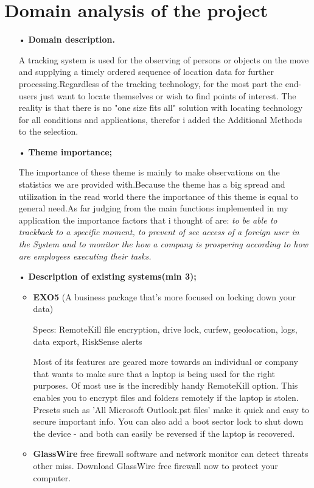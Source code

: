 \section{Domain analysis of the project}
\begin{itemize}
\item[•]\textbf{ Domain description.} \par
A tracking system is used for the observing of persons or objects on the move and supplying a timely ordered sequence of location data for further processing.Regardless of the tracking technology, for the most part the end-users just want to locate themselves or wish to find points of interest. The reality is that there is no "one size fits all" solution with locating technology for all conditions and applications, therefor i added the Additional Methods to the selection.
\item[•] \textbf{Theme importance;} \par
The importance of these theme is mainly to make observations on the statistics we are provided with.Because the theme has a big spread and utilization in the read world there the importance of this theme is equal to general need.As far judging from the main functions implemented in my application the importance factors that i thought of are: \textit{to be able to trackback to a specific moment, to prevent of see access of a foreign user in the System and to monitor the how a company is prospering according to how are employees executing their tasks.} 
\item[•] \textbf{Description of existing systems(min 3);}
\begin{itemize}
\item \textbf{EXO5} (A business package that's more focused on locking down your data)\par
Specs: RemoteKill file encryption, drive lock, curfew, geolocation, logs, data export, RiskSense alerts\par
Most of its features are geared more towards an individual or company that wants to make sure that a laptop is being used for the right purposes.
Of most use is the incredibly handy RemoteKill option. This enables you to encrypt files and folders remotely if the laptop is stolen. Presets such as 'All Microsoft Outlook.pst files' make it quick and easy to secure important info. You can also add a boot sector lock to shut down the device - and both can easily be reversed if the laptop is recovered.
\item \textbf{GlassWire} free firewall software and network monitor can detect threats other miss. Download GlassWire free firewall now to protect your computer.\par 

\end{itemize}
\end{itemize}
